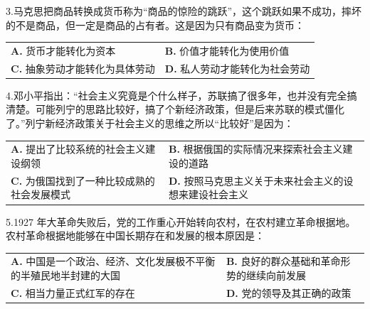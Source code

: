 \documentclass[UTF8,11pt]{ctexart}
\begin{document}
3.马克思把商品转换成货币称为“商品的惊险的跳跃”，这个跳跃如果不成功，摔坏的不是商品，但一定是商品的占有者。这是因为只有商品变为货币：


\begin{center}\begin{tabular}{>{\raggedright\arraybackslash}p{\dimexpr(\linewidth-4\tabcolsep)/2\relax}>{\raggedright\arraybackslash}p{\dimexpr(\linewidth-4\tabcolsep)/2\relax}}
\textbf{A.} 货币才能转化为资本 & \textbf{B.} 价值才能转化为使用价值\\[.35em]
\textbf{C.} 抽象劳动才能转化为具体劳动 & \textbf{D.} 私人劳动才能转化为社会劳动\\[.35em]\end{tabular}\end{center}

4.邓小平指出：“社会主义究竟是个什么样子，苏联搞了很多年，也并没有完全搞清楚。可能列宁的思路比较好，搞了个新经济政策，但是后来苏联的模式僵化了。”列宁新经济政策关于社会主义的思维之所以“比较好”是因为：


\begin{center}\begin{tabular}{>{\raggedright\arraybackslash}p{\dimexpr(\linewidth-4\tabcolsep)/2\relax}>{\raggedright\arraybackslash}p{\dimexpr(\linewidth-4\tabcolsep)/2\relax}}
\textbf{A.} 提出了比较系统的社会主义建设纲领 & \textbf{B.} 根据俄国的实际情况来探索社会主义建设的道路\\[.35em]
\textbf{C.} 为俄国找到了一种比较成熟的社会发展模式 & \textbf{D.} 按照马克思主义关于未来社会主义的设想来建设社会主义\\[.35em]\end{tabular}\end{center}

5.1927 年大革命失败后，党的工作重心开始转向农村，在农村建立革命根据地。农村革命根据地能够在中国长期存在和发展的根本原因是：


\begin{center}\begin{tabular}{>{\raggedright\arraybackslash}p{\dimexpr(\linewidth-4\tabcolsep)/2\relax}>{\raggedright\arraybackslash}p{\dimexpr(\linewidth-4\tabcolsep)/2\relax}}
\textbf{A.} 中国是一个政治、经济、文化发展极不平衡的半殖民地半封建的大国 & \textbf{B.} 良好的群众基础和革命形势的继续向前发展\\[.35em]
\textbf{C.} 相当力量正式红军的存在 & \textbf{D.} 党的领导及其正确的政策\\[.35em]\end{tabular}\end{center}
\end{document}
